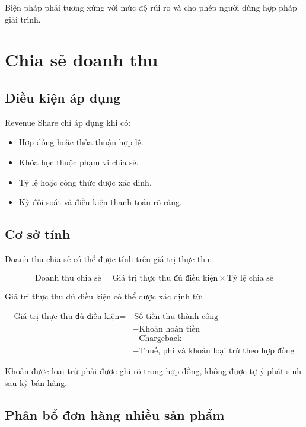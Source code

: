 \documentclass[12pt,a4paper]{article}
\begin{document}
Biện pháp phải tương xứng với mức độ rủi ro
và cho phép người dùng hợp pháp giải trình.

\section{Chia sẻ doanh thu}

\subsection{Điều kiện áp dụng}

Revenue Share chỉ áp dụng khi có:

\begin{itemize}
    \item Hợp đồng hoặc thỏa thuận hợp lệ.
    \item Khóa học thuộc phạm vi chia sẻ.
    \item Tỷ lệ hoặc công thức được xác định.
    \item Kỳ đối soát và điều kiện thanh toán rõ ràng.
\end{itemize}

\subsection{Cơ sở tính}

Doanh thu chia sẻ có thể được tính trên giá trị thực thu:

\[
\text{Doanh thu chia sẻ}
=
\text{Giá trị thực thu đủ điều kiện}
\times
\text{Tỷ lệ chia sẻ}
\]

Giá trị thực thu đủ điều kiện có thể được xác định từ:

\[
\begin{aligned}
\text{Giá trị thực thu đủ điều kiện}
=&\ \text{Số tiền thu thành công}\\
&-\text{Khoản hoàn tiền}\\
&-\text{Chargeback}\\
&-\text{Thuế, phí và khoản loại trừ theo hợp đồng}
\end{aligned}
\]

Khoản được loại trừ phải được ghi rõ trong hợp đồng,
không được tự ý phát sinh sau kỳ bán hàng.

\subsection{Phân bổ đơn hàng nhiều sản phẩm}
\end{document}
